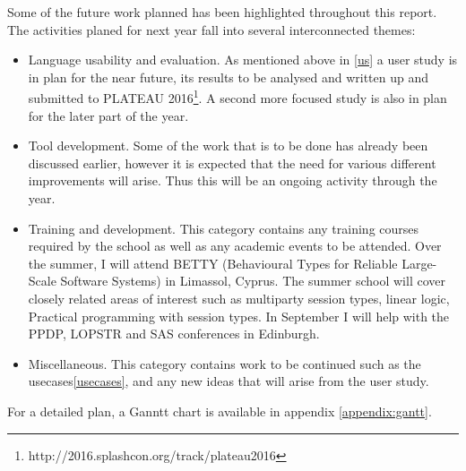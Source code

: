 Some of the future work planned has been highlighted throughout this report. The activities planed for next year fall into several interconnected themes:
\begin{itemize}
\item Language usability and evaluation. As mentioned above in \ref{us} a user study is in plan for the near future, its results to be analysed and written up and submitted to PLATEAU 2016\footnote{http://2016.splashcon.org/track/plateau2016}. A second more focused study is also in plan for the later part of the year. 
\item Tool development. Some of the work that is to be done has already been discussed earlier, however it is expected that the need for various different improvements will arise. Thus this will be an ongoing activity through the year. 
\item Training and development. This category contains any training courses required by the school as well as any academic events to be attended. Over the summer, I will attend BETTY (Behavioural Types for Reliable Large-Scale Software Systems) in Limassol, Cyprus. The summer school will cover closely related areas of interest such as multiparty session types, linear logic, Practical programming with session types. In September I will help with the PPDP, LOPSTR and SAS conferences in Edinburgh.
\item Miscellaneous. This category contains work to be continued such as the usecases\ref{usecases}, and any new ideas that will arise from the user study.
\end{itemize}

For a detailed plan, a Ganntt chart is available in appendix \ref{appendix:gantt}.

